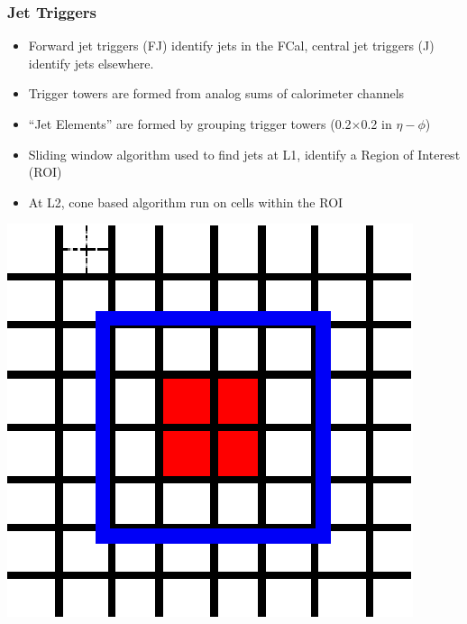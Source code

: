 \documentclass[10pt]{beamer}
\begin{document}
\begin{frame}\frametitle{Jet Triggers}
\begin{itemize}
\item Forward jet triggers (FJ) identify jets in the FCal, central jet triggers (J) identify jets elsewhere.
\item Trigger towers are formed from analog sums of calorimeter channels
\item ``Jet Elements'' are formed by grouping trigger towers (0.2$\times$0.2 in $\eta-\phi$)
\item Sliding window algorithm used to find jets at L1, identify a Region of Interest (ROI)
\item At L2, cone based algorithm run on cells within the ROI
\end{itemize}
\begin{center}
\includegraphics[width=0.35\linewidth,angle=0]{sliding_window.eps}
\end{center}
\end{frame}
\end{document}
